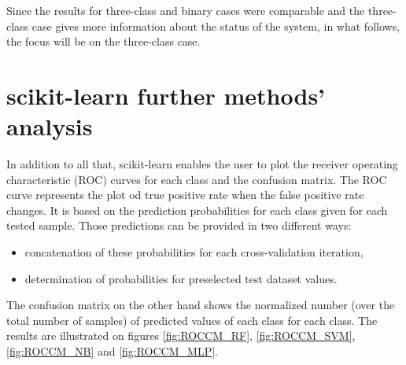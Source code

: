 Since the results for three-class and binary cases were comparable and the three-class case gives more information about the status of the system, in what follows, the focus will be on the three-class case.

\section{scikit-learn further methods' analysis}

In addition to all that, scikit-learn enables the user to plot the receiver operating characteristic (ROC) curves for each class and the confusion matrix. The ROC curve represents the plot od true positive rate when the false positive rate changes. It is based on the prediction probabilities for each class given for each tested sample. Those predictions can be provided in two different ways:
\begin{itemize}
    \item concatenation of these probabilities for each cross-validation iteration,
    \item determination of probabilities for preselected test dataset values.
\end{itemize} 
The confusion matrix on the other hand shows the normalized number (over the total number of samples) of predicted values of each class for each class. The results are illustrated on figures \ref{fig:ROCCM_RF}, \ref{fig:ROCCM_SVM}, \ref{fig:ROCCM_NB} and \ref{fig:ROCCM_MLP}.

